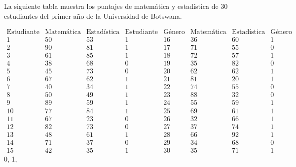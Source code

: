 
\question La siguiente tabla muestra los puntajes de matemática y estadística de 30 estudiantes del primer año de la Universidad de Botswana. 


\begin{center}
$
\begin{array}{llllllll}
\text{Estudiante} & \text{Matemática} & \text{Estadística} & \text{Estudiante} & \text{Género} & \text{Matemática} & \text{Estadística} & \text{Género} \\
1 & 50 & 53 & 1 & 16 & 36 & 60 & 1 \\
2 & 90 & 81 & 1 & 17 & 71 & 55 & 0 \\
3 & 61 & 85 & 1 & 18 & 72 & 57 & 1 \\
4 & 38 & 68 & 0 & 19 & 35 & 82 & 0 \\
5 & 45 & 73 & 0 & 20 & 62 & 62 & 1 \\
6 & 67 & 62 & 1 & 21 & 81 & 20 & 1 \\
7 & 40 & 34 & 1 & 22 & 74 & 55 & 0 \\
8 & 50 & 49 & 1 & 23 & 88 & 32 & 0 \\
9 & 89 & 59 & 1 & 24 & 55 & 59 & 1 \\
10 & 77 & 84 & 1 & 25 & 69 & 61 & 1 \\
11 & 67 & 23 & 0 & 26 & 32 & 66 & 1 \\
12 & 82 & 73 & 0 & 27 & 37 & 74 & 1 \\
13 & 48 & 61 & 1 & 28 & 66 & 92 & 1 \\
14 & 71 & 37 & 0 & 29 & 34 & 68 & 0 \\
15 & 42 & 35 & 1 & 30 & 35 & 71 & 1
\end{array}
$
0,  1, 
\end{center}

